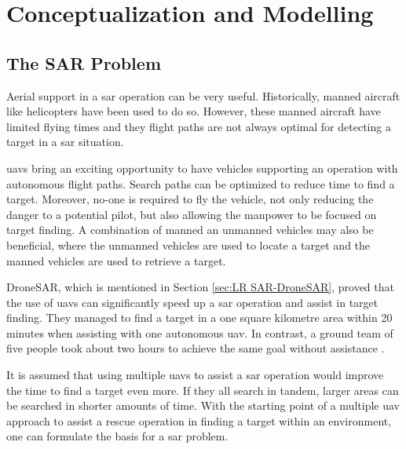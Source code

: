 \chapter{Conceptualization and Modelling}



\section{The SAR Problem}
Aerial support in a \ac{sar} operation can be very useful. Historically, manned aircraft like helicopters have been used to do so. However, these manned aircraft have limited flying times and they flight paths are not always optimal for detecting a target in a \ac{sar} situation.

\acp{uav} bring an exciting opportunity to have vehicles supporting an operation with autonomous flight paths. Search paths can be optimized to reduce time to find a target. Moreover, no-one is required to fly the vehicle, not only reducing the danger to a potential pilot, but also allowing the manpower to be focused on target finding. A combination of manned an unmanned vehicles may also be beneficial, where the unmanned vehicles are used to locate a target and the manned vehicles are used to retrieve a target.

DroneSAR, which is mentioned in Section \ref{sec:LR SAR-DroneSAR}, proved that the use of \acp{uav} can significantly speed up a \ac{sar} operation and assist in target finding. They managed to find a target in a one square kilometre area within 20 minutes when assisting with one autonomous \ac{uav}. In contrast, a ground team of five people took about two hours to achieve the same goal without assistance \cite{DroneSAR01}.

It is assumed that using multiple \acp{uav} to assist a \ac{sar} operation would improve the time to find a target even more. If they all search in tandem, larger areas can be searched in shorter amounts of time. With the starting point of a multiple \ac{uav} approach to assist a rescue operation in finding a target within an environment, one can formulate the basis for a \ac{sar} problem.

